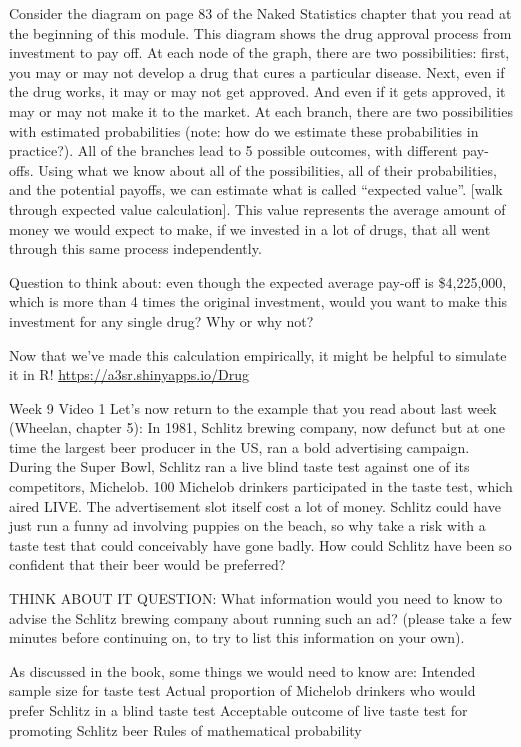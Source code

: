 \documentclass[]{book}
\begin{document}
Consider the diagram on page 83 of the Naked Statistics chapter that you read at the beginning of this module. This diagram shows the drug approval process from investment to pay off. At each node of the graph, there are two possibilities: first, you may or may not develop a drug that cures a particular disease. Next, even if the drug works, it may or may not get approved. And even if it gets approved, it may or may not make it to the market. At each branch, there are two possibilities with estimated probabilities (note: how do we estimate these probabilities in practice?). All of the branches lead to 5 possible outcomes, with different pay-offs. Using what we know about all of the possibilities, all of their probabilities, and the potential payoffs, we can estimate what is called ``expected value''. {[}walk through expected value calculation{]}. This value represents the average amount of money we would expect to make, if we invested in a lot of drugs, that all went through this same process independently.

Question to think about: even though the expected average pay-off is \$4,225,000, which is more than 4 times the original investment, would you want to make this investment for any single drug? Why or why not?

Now that we've made this calculation empirically, it might be helpful to simulate it in R! \url{https://a3sr.shinyapps.io/Drug}

Week 9 Video 1
Let's now return to the example that you read about last week (Wheelan, chapter 5):
In 1981, Schlitz brewing company, now defunct but at one time the largest beer producer in the US, ran a bold advertising campaign. During the Super Bowl, Schlitz ran a live blind taste test against one of its competitors, Michelob. 100 Michelob drinkers participated in the taste test, which aired LIVE. The advertisement slot itself cost a lot of money. Schlitz could have just run a funny ad involving puppies on the beach, so why take a risk with a taste test that could conceivably have gone badly. How could Schlitz have been so confident that their beer would be preferred?

THINK ABOUT IT QUESTION: What information would you need to know to advise the Schlitz brewing company about running such an ad? (please take a few minutes before continuing on, to try to list this information on your own).

As discussed in the book, some things we would need to know are:
Intended sample size for taste test
Actual proportion of Michelob drinkers who would prefer Schlitz in a blind taste test
Acceptable outcome of live taste test for promoting Schlitz beer
Rules of mathematical probability
\end{document}
